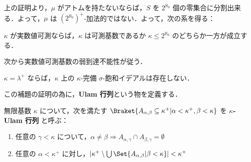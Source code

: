 \documentclass[a4j]{ltjsarticle}
\begin{document}
上の証明より，$\mu$ がアトムを持たないならば，$S$ を $2^{\aleph_0}$ 個の零集合に分割出来る．よって，$\mu$ は $(2^{\aleph_0})^+$-加法的ではない．よって，次の系を得る：

\begin{corollary}
 $\kappa$ が実数値可測ならば，$\kappa$ は可測基数であるか $\kappa \leq 2^{\aleph_0}$ のどちらか一方が成立する．
\end{corollary}

次から実数値可測基数の弱到達不能性が従う．

\begin{lemma}
 $\kappa = \lambda^+$ ならば，$\kappa$ 上の $\kappa$-完備 $\sigma$-飽和イデアルは存在しない．
\end{lemma}

この補題の証明の為に，{\bfseries Ulam 行列}という物を定義する．

\begin{definition}[Ulam 行列]
 無限基数 $\kappa$ について，次を満たす $\Braket{A_{\alpha, \beta} \subseteq \kappa^+ | \alpha < \kappa^+, \beta < \kappa }$ を {\bfseries $\kappa$-Ulam 行列} と呼ぶ：
 \begin{enumerate}[label=(\roman*)]
 \item 任意の $\gamma < \kappa$ について，$\alpha \neq \beta \Rightarrow A_{\alpha,\gamma} \cap A_{\beta, \gamma} = \emptyset$
 \item 任意の $\alpha < \kappa^+$ に対し，$\left|\kappa^+ \setminus \bigcup\Set{A_{\alpha, \beta} | \beta < \kappa}\right| < \kappa^+$
 \end{enumerate}
\end{definition}
\end{document}
